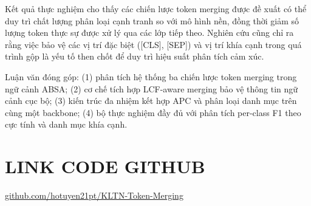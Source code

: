 ﻿\documentclass[14pt]{extreport}
\begin{document}
Kết quả thực nghiệm cho thấy các chiến lược token merging được đề xuất có thể duy trì chất lượng phân loại cạnh tranh so với mô hình nền, đồng thời giảm số lượng token thực sự được xử lý qua các lớp tiếp theo. Nghiên cứu cũng chỉ ra rằng việc bảo vệ các vị trí đặc biệt ([CLS], [SEP]) và vị trí khía cạnh trong quá trình gộp là yếu tố then chốt để duy trì hiệu suất phân tích cảm xúc.

Luận văn đóng góp: (1) phân tích hệ thống ba chiến lược token merging trong ngữ cảnh ABSA; (2) cơ chế tích hợp LCF-aware merging bảo vệ thông tin ngữ cảnh cục bộ; (3) kiến trúc đa nhiệm kết hợp APC và phân loại danh mục trên cùng một backbone; (4) bộ thực nghiệm đầy đủ với phân tích per-class F1 theo cực tính và danh mục khía cạnh.











\renewcommand{\bibname}{TÀI LIỆU THAM KHẢO}



\section{LINK CODE GITHUB}
\href{https://github.com/hotuyen21pt/KLTN-Token-Merging}{
\faGithub\space github.com/hotuyen21pt/KLTN-Token-Merging}
\end{document}
